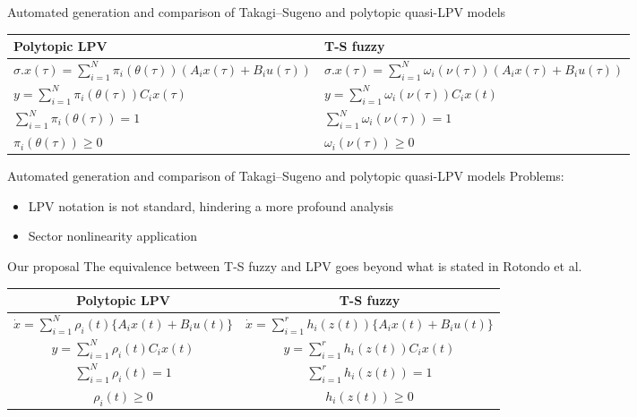 \begin{frame}{Automated generation and comparison of Takagi–Sugeno and polytopic quasi-LPV models \autocite{Rotondo2015}}
\begin{table}[htb]
    \centering
    \renewcommand{\arraystretch}{1.5}
    \begin{tabularx}{\textwidth}{
    |>{\centering\arraybackslash}X 
    |>{\centering\arraybackslash}X | }
    \hline Polytopic LPV & T-S fuzzy\\ \hline \hline
    $\sigma.x(\tau) = \displaystyle  \sum_{i=1}^{N}\pi_i(\theta(\tau))(A_ix(\tau)+B_iu(\tau))$ & $\sigma.x(\tau) = \displaystyle  \sum_{i=1}^{N}\omega_i(\nu(\tau))(A_ix(\tau)+B_iu(\tau))$\\
    $y= \displaystyle \sum_{i=1}^{N}\pi_i(\theta(\tau))C_ix(\tau)$ &
    $ y= \displaystyle  \sum_{i=1}^{N}\omega_i(\nu(\tau))C_ix(t)$ \\
    $\displaystyle\sum_{i=1}^{N}\pi_i(\theta(\tau)) = 1$ &
    $\displaystyle\sum_{i=1}^{N}\omega_i(\nu(\tau)) = 1$ \\
    $\displaystyle \pi_i(\theta(\tau)) \geq 0$ &
    $\displaystyle \omega_i(\nu(\tau)) \geq 0$ \\
    \hline
    \end{tabularx}
    \label{tab:comp}
\end{table}
\end{frame}

\begin{frame}{Automated generation and comparison of Takagi–Sugeno and polytopic quasi-LPV models}
Problems:
    \begin{itemize}
        \item LPV notation is not standard, hindering a more profound analysis
        \item Sector nonlinearity application
    \end{itemize}
\end{frame}
\begin{frame}{Our proposal}
    The equivalence between T-S fuzzy and LPV goes beyond what is stated in Rotondo et al.
    \begin{table}[htb]
    \centering
    \begin{tabularx}{\textwidth}{c|c}
         Polytopic LPV& T-S fuzzy  \\ \hline \hline
                $ \dot{x} = \displaystyle  \sum_{i=1}^{N}\rho_i(t)\{A_ix(t)+B_iu(t)\}$ & $\dot{x} = \displaystyle  \sum_{i=1}^{r}h_i(z(t))\{A_ix(t)+B_iu(t)\}$ \\
                $y= \displaystyle \sum_{i=1}^{N}\rho_i(t)C_ix(t)$ &  $ y= \displaystyle  \sum_{i=1}^{r}h_i(z(t))C_ix(t)$ \\
                $\displaystyle\sum_{i=1}^{N}\rho_i(t) = 1$ & $\displaystyle\sum_{i=1}^{r}h_i(z(t)) = 1$ \\
                $\displaystyle\rho_i(t) \geq 0$ & $\displaystyle h_i(z(t)) \geq 0$
     \end{tabularx}
    \label{tab:mycomp}
\end{table}
\end{frame}

